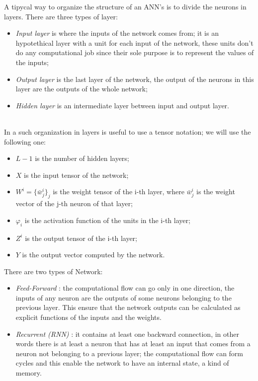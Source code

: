 A tipycal way to organize the structure of an ANN's is to divide the neurons in layers.  
There are three types of layer:
\begin{itemize}
\item \emph{Input layer}  is where the inputs of the network comes from; it is an hypotethical layer with a unit for each input of the network, these units don't do any computational job since their sole purpose is to represent the values of the inputs;
\item \emph{Output layer} is the last layer of the network, the output of the neurons in this layer are the outputs of the whole network;
\item \emph{Hidden layer} is an intermediate layer between input and output layer.
\end{itemize}
{}\\
In a such organization in layers is useful to use a tensor notation; we will use the following one:
	\begin{itemize}
	\item $L-1$ is the number of hidden layers;
	\item $X$ is the input tensor of the network;
	\item $W^i=\{\bar{w}^i_j\}_j$ is the weight tensor of the i-th layer, where $\bar{w}^i_j$ is the weight vector of the j-th neuron of that layer;
	\item $\varphi_i$ is the activation function of the units in the i-th layer;
	\item $Z^i$ is the output tensor of the i-th layer;
	\item $Y$ is the output vector computed by the network.
\end{itemize}

There are two types of Network:
\begin{itemize}
	\item \emph{Feed-Forward} : the computational flow can go only in one direction, the inputs of any neuron are the outputs of some neurons belonging to the previous layer. This ensure that the network outputs can be calculated as explicit functions of the inputs and the weights.\\
	\item \emph{Recurrent (RNN)} : it contains at least one backward connection, in other words there is at least a neuron that has at least an input that comes from a neuron not belonging to a previous layer; the computational flow can form cycles and this enable the network to have an internal state, a kind of memory.\\
\end{itemize}


